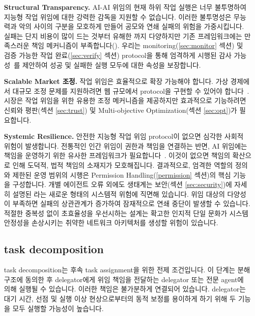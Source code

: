 \documentclass[11pt, a4paper, twocolumn, copyright, goog]{google}
\begin{document}
\textbf{Structural Transparency.} AI-AI 위임의 현재 하위 작업 실행은 너무 불투명하여 지능형 작업 위임에 대한 강력한 감독을 지원할 수 없습니다. 이러한 불투명성은 무능력과 악의 사이의 구분을 모호하게 만들어 공모와 연쇄 실패의 위험을 가중시킵니다. 실패는 단지 비용이 많이 드는 것부터 유해한 \citep{chan2023harms}까지 다양하지만 기존 프레임워크에는 만족스러운 책임 메커니즘이 부족합니다(\citep{gabriel2025s}). 우리는 monitoring(\ref{sec:monitor} 섹션) 및 검증 가능한 작업 완료(\ref{sec:verify} 섹션) protocol을 통해 엄격하게 시행된 감사 가능성~\citep{berghoff2021towards}를 제안하여 성공 및 실패한 실행 모두에 대한 속성을 보장합니다.

\textbf{Scalable Market 조정.} 작업 위임은 효율적으로 확장 가능해야 합니다. 가상 경제에서 대규모 조정 문제를 지원하려면 웹 규모에서 protocol을 구현할 수 있어야 합니다~\citep{tomasev2025virtualagenteconomies}. 시장은 작업 위임을 위한 유용한 조정 메커니즘을 제공하지만 효과적으로 기능하려면 신뢰와 평판(섹션 \ref{sec:trust}) 및 Multi-objective Optimization(섹션 \ref{sec:opt})가 필요합니다. 

\textbf{Systemic Resilience.} 안전한 지능형 작업 위임 protocol이 없으면 심각한 사회적 위험이 발생합니다. 전통적인 인간 위임이 권한과 책임을 연결하는 반면, AI 위임에는 책임을 운영하기 위한 유사한 프레임워크가 필요합니다~\citep{santoni2021four, dastani2023responsibility, porter2023unravelling}. 이것이 없으면 책임의 확산으로 인해 도덕적, 법적 책임의 소재지가 모호해집니다. 결과적으로, 엄격한 역할의 정의와 제한된 운영 범위의 시행은 Permission Handling(\ref{permission} 섹션)의 핵심 기능을 구성합니다. 개별 에이전트 오류 외에도 생태계는 보안(섹션 \ref{sec:security})에 자세히 설명된 \citep{uuk2024taxonomy, hammond2025multi}라는 새로운 형태의 시스템적 위험에 직면해 있습니다. 위임 대상의 다양성이 부족하면 실패의 상관관계가 증가하여 잠재적으로 연쇄 중단이 발생할 수 있습니다. 적절한 중복성 없이 초효율성을 우선시하는 설계는 확고한 인지적 단일 문화가 시스템 안정성을 손상시키는 취약한 네트워크 아키텍처를 생성할 위험이 있습니다.

\subsection{task decomposition}
\label{sec:decomp}

task decomposition는 후속 task assignment을 위한 전제 조건입니다. 이 단계는 분해 구조에 동의한 후 delegator에게 위임 책임을 전달하는 delegator 또는 전문 agent에 의해 실행될 수 있습니다. 이러한 책임은 불가분하게 연결되어 있습니다. delegator는 대기 시간, 선점 및 실행 이상 현상으로부터의 동적 보정를 용이하게 하기 위해 두 기능을 모두 실행할 가능성이 높습니다.
\end{document}
